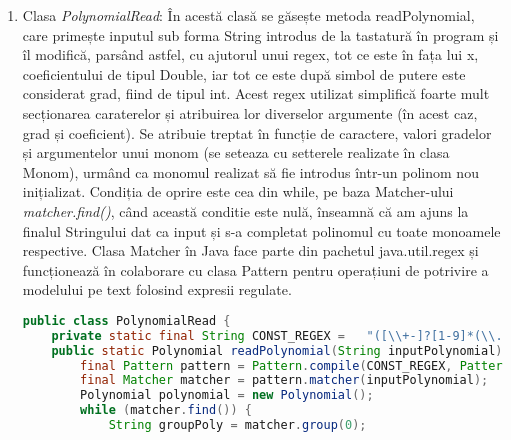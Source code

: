 \documentclass[a4paper,12pt]{article}
\begin{document}
\begin{enumerate}
\begin{enumerate}
\begin{lstlisting}[language = Java]
        Polynomial polynomialCopy = new Polynomial();
        for(int degree:polynomial.getMonoame().keySet()){
            Monom monom = new Monom();
            monom.setDegree(degree+1);
            monom.setCoefficient(polynomial.getMonoame().get(degree).getCoefficient()/(degree+1.0));
            polynomialCopy.addMonom(monom);
        }
        return polynomialCopy;
    }
\end{lstlisting}
\newline
\item Clasa \emph{PolynomialRead}: În acestă clasă se găsește metoda readPolynomial, care primește inputul sub forma String introdus de la tastatură în program și îl modifică, parsând astfel, cu ajutorul unui regex, tot ce este în fața lui x, coeficientului de tipul Double, iar tot ce este după simbol de putere este considerat grad, fiind de tipul int. Acest regex utilizat simplifică foarte mult secționarea caraterelor și atribuirea lor diverselor argumente (în acest caz, grad și coeficient). Se atribuie treptat în funcție de caractere, valori gradelor și argumentelor unui monom (se seteaza cu setterele realizate în clasa Monom), urmând ca monomul realizat să fie introdus într-un polinom nou inițializat. Condiția de oprire este cea din while, pe baza Matcher-ului \emph{matcher.find()}, când această conditie este nulă, înseamnă că am ajuns la finalul Stringului dat ca input și s-a completat polinomul cu toate monoamele respective. Clasa Matcher în Java face parte din pachetul java.util.regex și funcționează în colaborare cu clasa Pattern pentru operațiuni de potrivire a modelului pe text folosind expresii regulate.
\newline
\begin{lstlisting}[language = Java]
public class PolynomialRead {
    private static final String CONST_REGEX =   "([\\+-]?[1-9]*(\\.[0-9][0-9]*)?x\\^-?[2-9]+)|([\\+-]?[1-9]*(\\.[0-9][0-9]*)?x)|([\\+-]?[0-9]+(\\.[0-9][0-9]*)?)";
    public static Polynomial readPolynomial(String inputPolynomial){
        final Pattern pattern = Pattern.compile(CONST_REGEX, Pattern.MULTILINE);
        final Matcher matcher = pattern.matcher(inputPolynomial);
        Polynomial polynomial = new Polynomial();
        while (matcher.find()) {
            String groupPoly = matcher.group(0);

\end{lstlisting}
\end{enumerate}
\end{enumerate}
\end{document}
